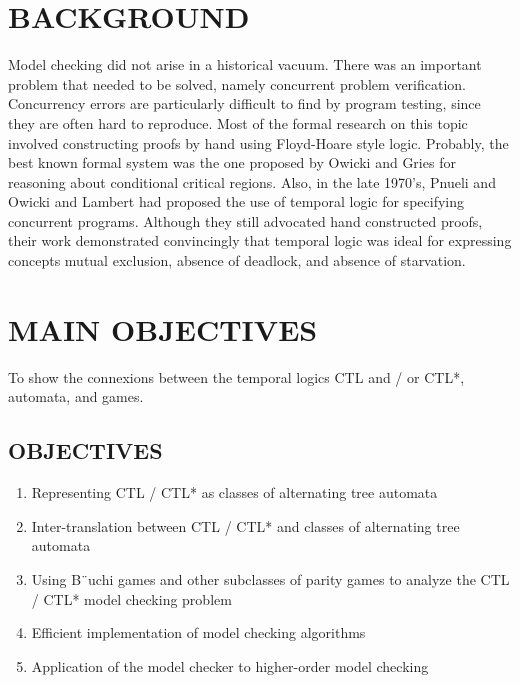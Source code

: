 \documentclass[12pt,letterpaper]{article}
\begin{document}
\section{BACKGROUND}
Model checking did not arise in a historical vacuum. There was an important problem that needed to be solved, namely concurrent problem verification. Concurrency errors are particularly difficult to find by program testing, since they are often hard to reproduce. Most of the formal research on this topic involved constructing proofs by hand using Floyd-Hoare style logic. Probably, the best known formal system was the one proposed by Owicki and Gries for reasoning about conditional critical regions.
Also, in the late 1970’s, Pnueli and Owicki and Lambert had proposed the use of temporal logic for specifying concurrent programs. Although they still advocated hand constructed proofs, their work demonstrated convincingly that temporal logic was ideal for expressing concepts mutual exclusion, absence of deadlock, and absence of starvation.

\section{MAIN OBJECTIVES}
 To show the connexions between the temporal logics CTL and / or CTL*, automata, and games.
\subsection{OBJECTIVES}
  \begin{enumerate}
    \item Representing CTL / CTL* as classes of alternating tree automata\\
    \item Inter-translation between CTL / CTL* and classes of alternating tree automata\\
    \item Using B¨uchi games and other subclasses of parity games to analyze the CTL / CTL* model checking problem\\
    \item Efficient implementation of model checking algorithms\\
    \item Application of the model checker to higher-order model checking\\
  \end{enumerate}
\end{document}
